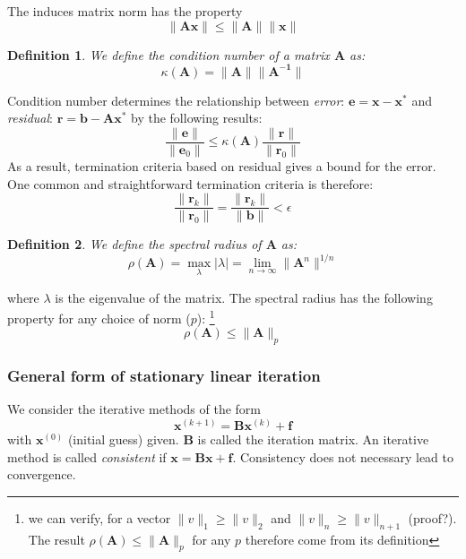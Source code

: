 \documentclass{article}
\newtheorem*{definition}{Definition}
\begin{document}
The induces matrix norm has the property
\begin{equation*}
    \|\mathbf{A}\mathbf{x}\| \leq \|\mathbf{A}\| \|\mathbf{x}\|
\end{equation*}

\begin{definition}
    We define the condition number of a matrix $\mathbf{A}$ as:
    \[\kappa(\mathbf{A}) = \|\mathbf{A}\| \|\mathbf{A^{-1}}\|\] 
\end{definition}
Condition number determines the relationship between 
\emph{error}: $\mathbf{e} = \mathbf{x} - \mathbf{x}^*$ and 
\emph{residual}: $\mathbf{r} = \mathbf{b} - \mathbf{A}\mathbf{x}^*$
by the following results:
\begin{equation}
    \frac{\|\mathbf{e}\|}{\|\mathbf{e}_0\|} \leq \kappa(\mathbf{A}) \frac{\|\mathbf{r}\|}{\|\mathbf{r}_0\|}
\end{equation}
As a result, termination criteria based on residual gives a bound for the error. One common and straightforward 
termination criteria is therefore:
\begin{equation*}
    \frac{\|\mathbf{r}_k\|}{\|\mathbf{r}_0\|} = \frac{\|\mathbf{r}_k\|}{\|\mathbf{b}\|} < \epsilon
\end{equation*}

\begin{definition}
    We define the spectral radius of $\mathbf{A}$ as:
    \[ \rho(\mathbf{A}) = \max_{\lambda} |\lambda| = \lim_{n\to\infty} \|\mathbf{A}^n\|^{1/n} \] 
\end{definition}
where $\lambda$ is the eigenvalue of the matrix. 
The spectral radius has the following property 
for any choice of norm ($p$):
\footnote{we can verify, for a vector $\|v\|_1 \geq \|v\|_2$ and $\|v\|_{n} \geq \|v\|_{n+1}$ (proof?). 
The result $\rho(\mathbf{A}) \leq \|\mathbf{A}\|_p$ for any $p$ therefore come from its definition}
\begin{equation*}
    \rho(\mathbf{A}) \leq \|\mathbf{A}\|_p    
\end{equation*}

\subsubsection*{General form of stationary linear iteration}
We consider the iterative methods of the form 
\begin{equation}
    \label{generalstationarylinear}
    \mathbf{x}^{(k+1)} = \mathbf{B}\mathbf{x}^{(k)} + \mathbf{f}
\end{equation}
with $\mathbf{x}^{(0)}$ (initial guess) given. $\mathbf{B}$ is called the iteration matrix.
An iterative method is called \emph{consistent} if 
$\mathbf{x} = \mathbf{B}\mathbf{x} + \mathbf{f}$. Consistency does not necessary lead
to convergence. 
\end{document}
